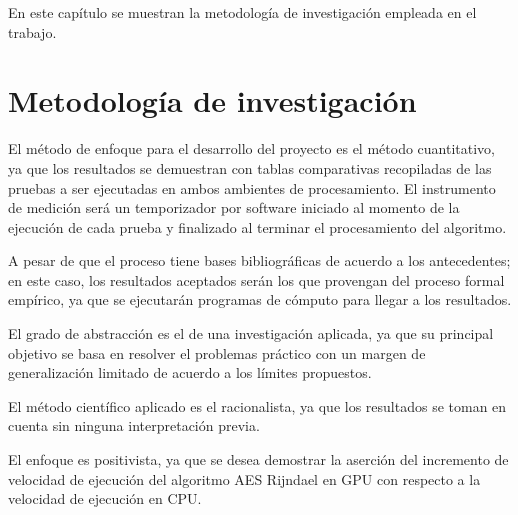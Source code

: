 \documentclass[../main/main.tex]{subfiles}
\begin{document}
\espacio
  En este capítulo se muestran la metodología de investigación empleada en el trabajo.

  \section{Metodología de investigación}

  El método de enfoque para el desarrollo del proyecto es el método cuantitativo, ya que los resultados se demuestran con tablas comparativas recopiladas de las pruebas a ser ejecutadas en ambos ambientes de procesamiento. El instrumento de medición será un temporizador por software iniciado al momento de la ejecución de cada prueba y finalizado al terminar el procesamiento del algoritmo.
  
  A pesar de que el proceso tiene bases bibliográficas de acuerdo a los antecedentes; en este caso, los resultados aceptados serán los que provengan del proceso formal empírico, ya que se ejecutarán programas de cómputo para llegar a los resultados.
  
  El grado de abstracción es el de una investigación aplicada, ya que su principal objetivo se basa en resolver el problemas práctico con un margen de generalización limitado de acuerdo a los límites propuestos.

  El método científico aplicado es el racionalista, ya que los resultados se toman en cuenta sin ninguna interpretación previa.
  
  El enfoque es positivista, ya que se desea demostrar la aserción del incremento de velocidad de ejecución del algoritmo AES Rijndael en GPU con respecto a la velocidad de ejecución en CPU.
\end{document}
